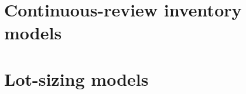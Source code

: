 %
%






\frontmatter
\begin{titlepage}

\end{titlepage}
\setcounter{page}{0}
\cleardoublepage

\begin{titlepage}

\end{titlepage}
\setcounter{page}{0}
\cleardoublepage

\setlength{\parskip}{0.6em}	





\setlength{\parskip}{0em}	

\tableofcontents
\cleardoublepage
{}
{}
\listoffigures
\cleardoublepage
{}
{}
\listoftables

\setlength{\parskip}{0.6em}	

\mainmatter


	

\cleardoublepage
\part{Continuous-review inventory models}
\label{part:continuous-review-inventory-model}




\cleardoublepage
\part{Lot-sizing models}
\label{part:production planning}




